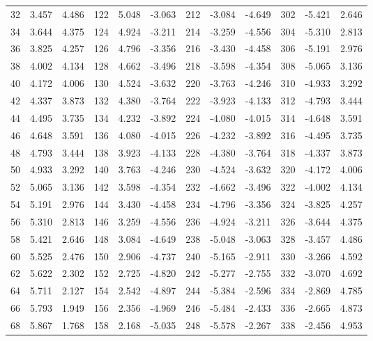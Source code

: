\begin{table}
{\begin{tabular}{rrr|rrr|rrr|rrr}
 32 &   3.457 &  4.486 & 122 &   5.048 & -3.063 & 212 &  -3.084 & -4.649 & 302 &  -5.421 &  2.646\\
 34 &   3.644 &  4.375 & 124 &   4.924 & -3.211 & 214 &  -3.259 & -4.556 & 304 &  -5.310 &  2.813\\
 36 &   3.825 &  4.257 & 126 &   4.796 & -3.356 & 216 &  -3.430 & -4.458 & 306 &  -5.191 &  2.976\\
 38 &   4.002 &  4.134 & 128 &   4.662 & -3.496 & 218 &  -3.598 & -4.354 & 308 &  -5.065 &  3.136\\
 40 &   4.172 &  4.006 & 130 &   4.524 & -3.632 & 220 &  -3.763 & -4.246 & 310 &  -4.933 &  3.292\\
 42 &   4.337 &  3.873 & 132 &   4.380 & -3.764 & 222 &  -3.923 & -4.133 & 312 &  -4.793 &  3.444\\
 44 &   4.495 &  3.735 & 134 &   4.232 & -3.892 & 224 &  -4.080 & -4.015 & 314 &  -4.648 &  3.591\\
 46 &   4.648 &  3.591 & 136 &   4.080 & -4.015 & 226 &  -4.232 & -3.892 & 316 &  -4.495 &  3.735\\
 48 &   4.793 &  3.444 & 138 &   3.923 & -4.133 & 228 &  -4.380 & -3.764 & 318 &  -4.337 &  3.873\\
 50 &   4.933 &  3.292 & 140 &   3.763 & -4.246 & 230 &  -4.524 & -3.632 & 320 &  -4.172 &  4.006\\
 52 &   5.065 &  3.136 & 142 &   3.598 & -4.354 & 232 &  -4.662 & -3.496 & 322 &  -4.002 &  4.134\\
 54 &   5.191 &  2.976 & 144 &   3.430 & -4.458 & 234 &  -4.796 & -3.356 & 324 &  -3.825 &  4.257\\
 56 &   5.310 &  2.813 & 146 &   3.259 & -4.556 & 236 &  -4.924 & -3.211 & 326 &  -3.644 &  4.375\\
 58 &   5.421 &  2.646 & 148 &   3.084 & -4.649 & 238 &  -5.048 & -3.063 & 328 &  -3.457 &  4.486\\
 60 &   5.525 &  2.476 & 150 &   2.906 & -4.737 & 240 &  -5.165 & -2.911 & 330 &  -3.266 &  4.592\\
 62 &   5.622 &  2.302 & 152 &   2.725 & -4.820 & 242 &  -5.277 & -2.755 & 332 &  -3.070 &  4.692\\
 64 &   5.711 &  2.127 & 154 &   2.542 & -4.897 & 244 &  -5.384 & -2.596 & 334 &  -2.869 &  4.785\\
 66 &   5.793 &  1.949 & 156 &   2.356 & -4.969 & 246 &  -5.484 & -2.433 & 336 &  -2.665 &  4.873\\
 68 &   5.867 &  1.768 & 158 &   2.168 & -5.035 & 248 &  -5.578 & -2.267 & 338 &  -2.456 &  4.953\\

\end{tabular}}
\end{table}
